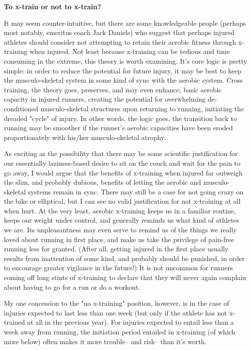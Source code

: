 \textbf{To x-train or not to x-train?}

\bigskip

It may seem counter-intuitive, but there are some knowledgeable people (perhaps most notably, emeritus coach Jack Daniels) who suggest that perhaps injured athletes should consider not attempting to retain their aerobic fitness through x-training when injured. Not least because x-training can be tedious and time consuming in the extreme, this theory is worth examining. It's core logic is pretty simple: in order to reduce the potential for future injury, it may be best to keep the musculo-skeletal system in some kind of sync with the aerobic system. Cross training, the theory goes, preserves, and may even enhance, basic aerobic capacity in injured runners, creating the potential for overwhelming de-conditioned musculo-skeletal structures upon returning to running, initiating the dreaded "cycle" of injury. In other words, the logic goes, the transition back to running may be smoother if the runner's aerobic capacities have been eroded proportionately with his/her musculo-skeletal atrophy.

As exciting as the possibility that there may be some scientific justification for our essentially laziness-based desire to sit on the couch and wait for the pain to go away, I would argue that the benefits of x-training when injured far outweigh the slim, and probably dubious, benefits of letting the aerobic and musculo-skeletal systems remain in sync. There may still be a case for not going crazy on the bike or elliptical, but I can see no valid justification for not x-training at all when hurt. At the very least, aerobic x-training keeps us in a familiar routine, keeps our weight under control, and generally reminds us what kind of athletes we are. Its unpleasantness may even serve to remind us of the things we really loved about running in first place, and make us take the privilege of pain-free running less for granted. (After all, getting injured in the first place usually results from inattention of some kind, and probably should be punished, in order to encourage greater vigilance in the future!) It is not uncommon for runners coming off long stints of x-training to declare that they will never again complain about having to go for a run or do a workout.

My one concession to the "no x-training" position, however, is in the case of injuries expected to last less than one week (but only if the athlete has not x-trained at all in the previous year). For injuries expected to entail less than a week away from running, the initiation period entailed in x-training (of which more below) often makes it more trouble-- and risk-- than it's worth.



